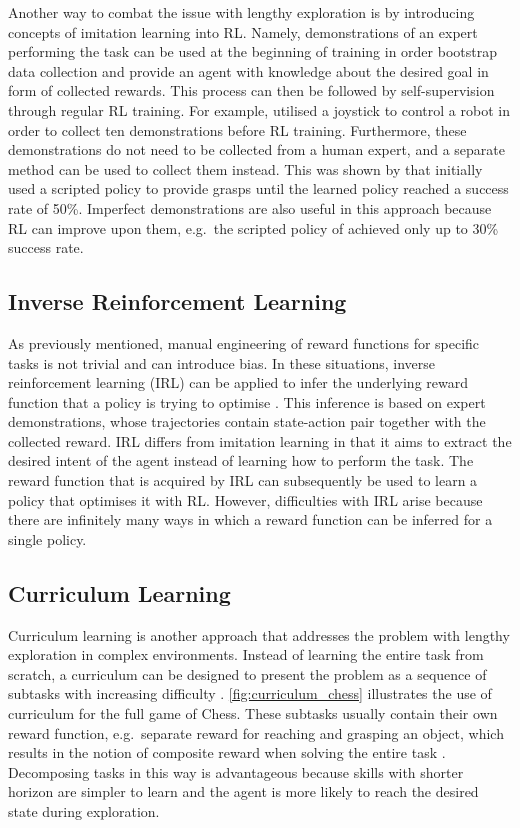 Another way to combat the issue with lengthy exploration is by introducing concepts of imitation learning into RL. Namely, demonstrations of an expert performing the task can be used at the beginning of training in order bootstrap data collection and provide an agent with knowledge about the desired goal in form of collected rewards. This process can then be followed by self-supervision through regular RL training. For example, \citet{zhan_framework_2020} utilised a joystick to control a robot in order to collect ten demonstrations before RL training. Furthermore, these demonstrations do not need to be collected from a human expert, and a separate method can be used to collect them instead. This was shown by \citet{kalashnikov_qt-opt_2018} that initially used a scripted policy to provide grasps until the learned policy reached a success rate of 50\%. Imperfect demonstrations are also useful in this approach because RL can improve upon them, e.g.~the scripted policy of \citet{kalashnikov_qt-opt_2018} achieved only up to 30\% success rate.


\subsection{Inverse Reinforcement Learning}

As previously mentioned, manual engineering of reward functions for specific tasks is not trivial and can introduce bias. In these situations, inverse reinforcement learning (IRL) can be applied to infer the underlying reward function that a policy is trying to optimise \cite{kroemer_review_2021}. This inference is based on expert demonstrations, whose trajectories contain state-action pair together with the collected reward. IRL differs from imitation learning in that it aims to extract the desired intent of the agent instead of learning how to perform the task. The reward function that is acquired by IRL can subsequently be used to learn a policy that optimises it with RL. However, difficulties with IRL arise because there are infinitely many ways in which a reward function can be inferred for a single policy.


\subsection{Curriculum Learning}

Curriculum learning is another approach that addresses the problem with lengthy exploration in complex environments. Instead of learning the entire task from scratch, a curriculum can be designed to present the problem as a sequence of subtasks with increasing difficulty \cite{narvekar_curriculum_2020}. \autoref{fig:curriculum_chess} illustrates the use of curriculum for the full game of Chess. These subtasks usually contain their own reward function, e.g.~separate reward for reaching and grasping an object, which results in the notion of composite reward when solving the entire task \cite{popov_data-efficient_2017}. Decomposing tasks in this way is advantageous because skills with shorter horizon are simpler to learn and the agent is more likely to reach the desired state during exploration.

